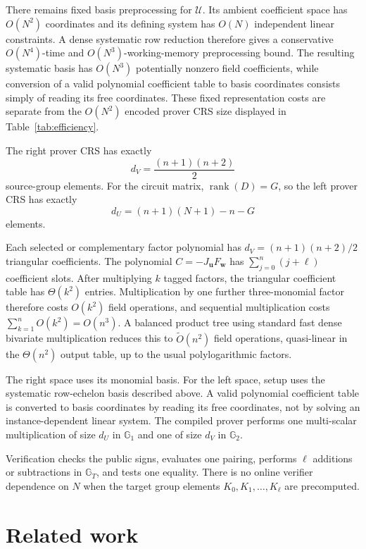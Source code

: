 \documentclass[11pt]{article}
\theoremstyle{definition}
\newcommand{\Gone}{\mathbb G_1}
\newcommand{\Gtwo}{\mathbb G_2}
\newcommand{\GT}{\mathbb G_T}
\newcommand{\cU}{\mathcal U}
\begin{document}
There remains fixed basis preprocessing for $\cU$.  Its ambient coefficient
space has $O(N^2)$ coordinates and its defining system has $O(N)$ independent
linear constraints.  A dense systematic row reduction therefore gives a
conservative $O(N^4)$-time and $O(N^3)$-working-memory preprocessing bound.
The resulting systematic basis has $O(N^3)$ potentially nonzero field
coefficients, while conversion of a valid polynomial coefficient table to
basis coordinates consists simply of reading its free coordinates.  These
fixed representation costs are separate from the $O(N^2)$ encoded prover CRS
size displayed in Table~\ref{tab:efficiency}.


The right prover CRS has exactly
\[
  d_V=\frac{(n+1)(n+2)}2
\]
source-group elements.  For the circuit matrix, $\operatorname{rank}(D)=G$,
so the left prover CRS has exactly
\[
  d_U=(n+1)(N+1)-n-G
\]
elements.

Each selected or complementary factor polynomial has
$d_V=(n+1)(n+2)/2$ triangular coefficients.  The polynomial
$C=-J_{\mathbf u}F_{\mathbf w}$ has
$\sum_{j=0}^{n}(j+\ell)$ coefficient slots.  After multiplying $k$ tagged
factors, the triangular coefficient table has $\Theta(k^2)$ entries.
Multiplication by one further three-monomial factor therefore costs $O(k^2)$ field
operations, and sequential multiplication costs
$\sum_{k=1}^nO(k^2)=O(n^3)$.  A balanced product tree using standard fast
dense bivariate multiplication reduces this to $\widetilde O(n^2)$ field
operations, quasi-linear in the $\Theta(n^2)$ output table, up to the usual
polylogarithmic factors.

The right space uses its monomial basis.  For the left space, setup uses the
systematic row-echelon basis described above.  A valid polynomial coefficient
table is converted to basis coordinates by reading its free coordinates, not
by solving an instance-dependent linear system.  The compiled prover performs
one multi-scalar multiplication of size $d_U$ in $\Gone$ and one of size
$d_V$ in $\Gtwo$.

Verification checks the public signs, evaluates one pairing, performs
$\ell$ additions or subtractions in $\GT$, and tests one equality.  There
is no online verifier dependence on $N$ when the target group elements
$K_0,K_1,\ldots,K_\ell$ are precomputed.

\section{Related work}
\end{document}
